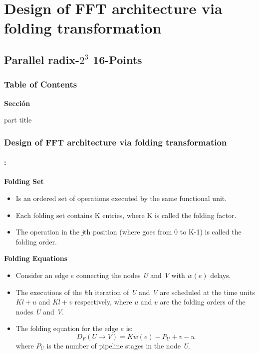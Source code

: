 \section{Design of FFT architecture via folding transformation}
\subsection{Parallel radix-$2^3$ 16-Points}
\begin{frame}
  \frametitle{\textbf{Table of Contents}}
  \begin{center}
    {\vspace{-1.5cm}\Large \textbf{Sección \thesection}\vspace{0.5cm}}
    \begin{beamercolorbox}[
      sep=8pt,center]{part title}
      \textbf{\insertsection}
    \end{beamercolorbox}
  \end{center}
\end{frame}


\begin{frame}
	\frametitle{\textbf{Design of FFT architecture via folding transformation}}
	\framesubtitle{\secname : \subsecname}
	
	\begin{block}{\centering \textbf{Folding Set}}
		\begin{itemize}\justifying\footnotesize
        	\item Is an ordered set of operations executed by the same functional unit.
        	\item Each folding set contains K entries, where K is called the folding factor.
        	\item The operation in the \textit{j}th position (where goes from 0 to K-1) is called the folding order.
       	\end{itemize}
	\end{block}

	\begin{block}{\centering \textbf{Folding Equations}}
		\begin{itemize}\justifying\footnotesize
			\item Consider an edge $e$ connecting the nodes \textit{U} and \textit{V} with $w(e)$ delays. 
			\item The executions of the \textit{l}th iteration of \textit{U} and \textit{V} are scheduled at the time units $Kl+u$ and $Kl+v$ respectively, where $u$ and $v$ are the folding orders of the nodes \textit{U} and \textit{V}.
			\item  The folding equation for the edge $e$ is:
			\begin{equation}\label{eqn:fold_equation}
				D_F(U \to V) = Kw(e)-P_U+v-u
			\end{equation}
			where $P_U$ is the number of pipeline stages in the node \textit{U}.
	    \end{itemize}
	\end{block}
\end{frame}


